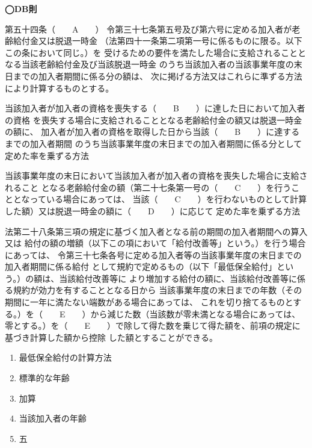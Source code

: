 \begin{fillblank}[年金2 2024 問題1(2)C〜E　\&　数理人試験 2021 問題1 設問2 A〜C]
  \noindent \textbf{◯DB則}
  \begin{lawstructure}
    \begin{lawarticle}{第五十四条}{（　　A　　）}
      令第三十七条第五号及び第六号に定める加入者が老齢給付金又は脱退一時金
      （法第四十一条第二項第一号に係るものに限る。以下この条において同じ。）を
      受けるための要件を満たした場合に支給されることとなる当該老齢給付金及び当該脱退一時金
      のうち当該加入者の当該事業年度の末日までの加入者期間に係る分の額は、
      次に掲げる方法又はこれらに準ずる方法により計算するものとする。

      当該加入者が加入者の資格を喪失する（　　B　　）に達した日において加入者の資格
      を喪失する場合に支給されることとなる老齢給付金の額又は脱退一時金の額に、
      加入者が加入者の資格を取得した日から当該（　　B　　）に達するまでの加入者期間
      のうち当該事業年度の末日までの加入者期間に係る分として定めた率を乗ずる方法

      当該事業年度の末日において当該加入者が加入者の資格を喪失した場合に支給されること
      となる老齢給付金の額（第二十七条第一号の（　　C　　）を行うこととなっている場合にあっては、
      当該（　　C　　）を行わないものとして計算した額）又は脱退一時金の額に（　　D　　）に応じて
      定めた率を乗ずる方法

      法第二十八条第三項の規定に基づく加入者となる前の期間の加入者期間への算入又は
      給付の額の増額（以下この項において「給付改善等」という。）を行う場合にあっては、
      令第三十七条各号に定める加入者等の当該事業年度の末日までの加入者期間に係る給付
      として規約で定めるもの（以下「最低保全給付」という。）の額は、当該給付改善等に
      より増加する給付の額に、当該給付改善等に係る規約が効力を有することとなる日から
      当該事業年度の末日までの年数（その期間に一年に満たない端数がある場合にあっては、
      これを切り捨てるものとする。）を（　　E　　）から減じた数（当該数が零未満となる場合にあっては、
      零とする。）を（　　E　　）で除して得た数を乗じて得た額を、前項の規定に基づき計算した額から控除
      した額とすることができる。
    \end{lawarticle}
  \end{lawstructure}
\end{fillblank}

\begin{answerbox}
  \begin{enumerate}[A: ]
    \item 最低保全給付の計算方法
    \item 標準的な年齢
    \item 加算
    \item 当該加入者の年齢
    \item 五
  \end{enumerate}
\end{answerbox}

